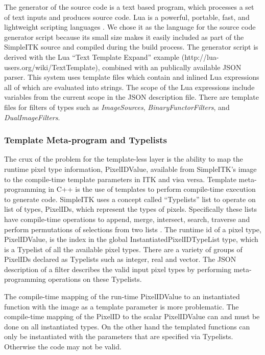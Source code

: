 \documentclass{frontiersMED} %
\begin{document}
The generator of the source code is a text based program, which
processes a set of text inputs and produces source code. Lua is a
powerful, portable, fast, and lightweight scripting languages
\cite{Ierusalimschy2006}. We chose it as the language for the source code
generator script because its small size makes it easily included as
part of the SimpleITK source and compiled during the build
process. The generator script is derived with the Lua ``Text Template
Expand'' example (http://lua-users.org/wiki/TextTemplate), combined
with an publically available JSON  parser. This system uses template
files which contain and inlined Lua expressions all of which are
evaluated into strings. The scope of the Lua expressions include
variables from the current scope in the JSON description file. There
are template files for filters of types such as \textit{ImageSources},
\textit{BinaryFunctorFilters}, and \textit{DualImageFilters}.

\subsubsection{Template Meta-program and Typelists}
The crux of the problem for the template-less layer is the ability to
map the runtime pixel type information, PixelIDValue, available from
SimpleITK's image to the compile-time template parameters in ITK and
visa versa. Template meta-programming in C++ is the use of templates
to perform compile-time execution to generate code. SimpleITK uses a
concept called ``Typelists'' list to operate on list of types, PixelIDs,
which represent the types of pixels. Specifically these lists have
compile-time operations to append, merge, intersect, search, traverse
and perform permutations of selections from two lists
\cite{Alexandrescu2001}. The runtime id of a pixel type, PixelIDValue, is
the index in the global InstantiatedPixelIDTypeList type, which is a
Typelist of all the available pixel types. There are a variety of
groups of PixelIDs declared as Typelists such as integer, real and
vector. The JSON description of a filter describes the valid input
pixel types by performing meta-programming operations on these
Typelists.

The compile-time mapping of the run-time PixelIDValue to an
instantiated function with the image as a template parameter is more
problematic. The compile-time mapping of the PixelID to the scalar
PixelIDValue can and must be done on all instantiated types. On the
other hand the templated functions can only be instantiated with the
parameters that are specified via Typelists. Otherwise the code may
not be valid.
\end{document}
